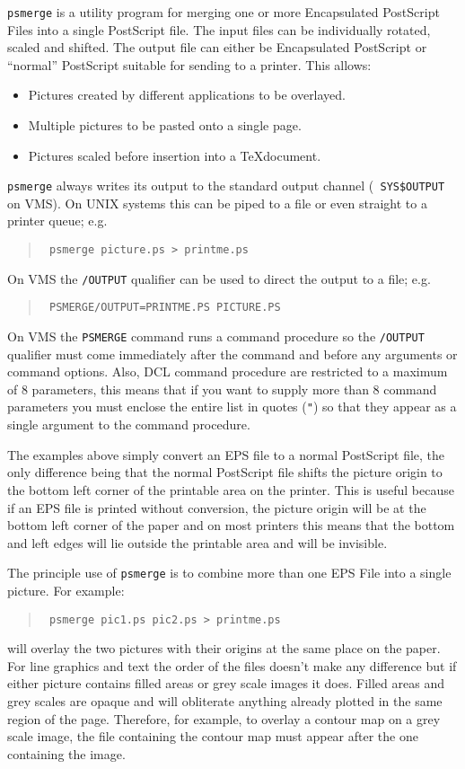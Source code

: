 {\tt psmerge} is a utility program for merging one or more Encapsulated
PostScript Files into a single PostScript file. The input files can be
individually rotated, scaled and shifted. The output file can either be
Encapsulated PostScript or ``normal'' PostScript suitable for sending to a
printer. This allows:
\begin{itemize}
\item Pictures created by different applications to be overlayed.
\item Multiple pictures to be pasted onto a single page.
\item Pictures scaled before insertion into a \TeX document.
\end{itemize}

{\tt psmerge} always writes its output to the standard output channel ({\tt
SYS\$OUTPUT} on  VMS). On UNIX systems this can be piped to a file or even
straight to a printer queue; e.g.
\begin{quote}\tt
psmerge picture.ps > printme.ps
\end{quote}
On VMS the {\tt /OUTPUT} qualifier can be used to direct the output to a file;
e.g.
\begin{quote}\tt
PSMERGE/OUTPUT=PRINTME.PS PICTURE.PS
\end{quote}
On VMS the {\tt PSMERGE} command runs a command procedure so the {\tt /OUTPUT}
qualifier must come immediately after the command and before any arguments or
command options. Also, DCL command procedure are restricted to a
maximum of 8 parameters, this  means that if you want to supply more than 8
command parameters you must enclose the entire list in quotes ({\tt "}) so that
they appear as a single argument to the command procedure.

The examples above simply convert an EPS file to a normal PostScript file, the
only difference being that the normal PostScript file shifts the picture origin
to the bottom left corner of the printable area on the printer. This is useful
because if an EPS file is printed without conversion, the picture origin will be
at the bottom left corner of the paper and on most printers this means that the
bottom and left edges will lie outside the printable area and will be invisible.

The principle use of {\tt psmerge} is to combine more than one EPS File into a
single picture. For example:
\begin{quote}\tt
psmerge pic1.ps pic2.ps > printme.ps
\end{quote}
will overlay the two pictures with their origins at the same place on the
paper. For line graphics and text the order of the files doesn't make any
difference but if either picture contains filled areas or grey scale images it
does. Filled areas and grey scales are opaque and will obliterate anything
already plotted in the same region of the page. Therefore, for example, to
overlay a contour map on a grey scale image, the file containing the contour
map must appear after the one containing the image.

